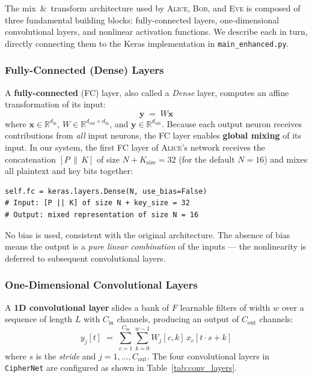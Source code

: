 \documentclass[12pt, a4paper]{article}
\newcommand{\alice}{\textsc{Alice}}
\newcommand{\bob}{\textsc{Bob}}
\newcommand{\eve}{\textsc{Eve}}
\newcommand{\code}[1]{\texttt{\color{CodeRed}#1}}
\begin{document}
The mix~\&~transform architecture used by \alice{}, \bob{}, and \eve{}
is composed of three fundamental building blocks: fully-connected layers,
one-dimensional convolutional layers, and nonlinear activation functions.
We describe each in turn, directly connecting them to the Keras
implementation in \code{main\_enhanced.py}.

\subsubsection*{Fully-Connected (Dense) Layers}

A \textbf{fully-connected} (FC) layer, also called a \emph{Dense} layer,
computes an affine transformation of its input:
%
\begin{equation}
  \mathbf{y} \;=\; W\mathbf{x}
  \label{eq:fc}
\end{equation}
%
where $\mathbf{x} \in \mathbb{R}^{d_{\text{in}}}$,
$W \in \mathbb{R}^{d_{\text{out}} \times d_{\text{in}}}$, and
$\mathbf{y} \in \mathbb{R}^{d_{\text{out}}}$. Because each output neuron
receives contributions from \emph{all} input neurons, the FC layer enables
\textbf{global mixing} of its input. In our system, the first FC layer of
\alice{}'s network receives the concatenation $[P \,\|\, K]$ of size
$N + K_{\text{size}} = 32$ (for the default $N = 16$) and mixes all
plaintext and key bits together:

\begin{lstlisting}[caption={FC layer in \code{CipherNet} — global key-plaintext mixing}]
self.fc = keras.layers.Dense(N, use_bias=False)
# Input: [P || K] of size N + key_size = 32
# Output: mixed representation of size N = 16
\end{lstlisting}

No bias is used, consistent with the original architecture. The absence
of bias means the output is a \emph{pure linear combination} of the
inputs — the nonlinearity is deferred to subsequent convolutional layers.

\subsubsection*{One-Dimensional Convolutional Layers}

A \textbf{1D convolutional layer} slides a bank of $F$ learnable filters
of width $w$ over a sequence of length $L$ with $C_{\text{in}}$ channels,
producing an output of $C_{\text{out}}$ channels:
%
\begin{equation}
  y_j[t] \;=\; \sum_{c=1}^{C_{\text{in}}} \sum_{k=0}^{w-1}
               W_j[c,k]\, x_c[t \cdot s + k]
  \label{eq:conv1d}
\end{equation}
%
where $s$ is the \emph{stride} and $j = 1, \ldots, C_{\text{out}}$.
The four convolutional layers in \code{CipherNet} are configured as shown
in Table~\ref{tab:conv_layers}.
\end{document}
